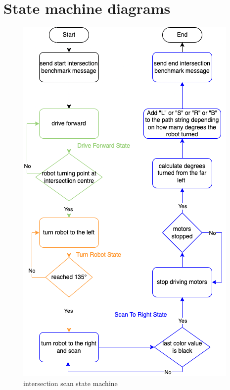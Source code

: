 \section{State machine diagrams}

\begin{figure}[h]
    \centering
    \includegraphics[scale=0.65]{resources/fixed-intersection-state-machine.png}
    \caption{\FixedSensorRobot intersection scan state machine}
    \label{fig:fixed_intersection_scan_state_machine}
\end{figure}

